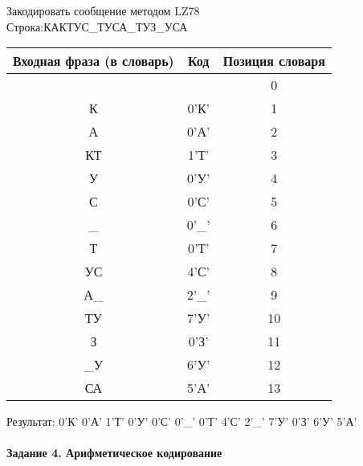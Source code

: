 \documentclass[a4paper, 12pt]{article}
\begin{document}
Закодировать сообщение методом LZ78\\
Строка:КАКТУС\_ТУСА\_ТУЗ\_УСА\\
\begin{table}[h!]
\centering
\begin{tabular}{|c|c|c|} 
\hline
 Входная фраза (в словарь) & Код & Позиция словаря \\ \hline

 &  & 0 \\ \hline
К & 0'К' & 1 \\ \hline
А & 0'А' & 2 \\ \hline
КТ & 1'Т' & 3 \\ \hline
У & 0'У' & 4 \\ \hline
С & 0'С' & 5 \\ \hline
\_ & 0'\_' & 6 \\ \hline
Т & 0'Т' & 7 \\ \hline
УС & 4'С' & 8 \\ \hline
А\_ & 2'\_' & 9 \\ \hline
ТУ & 7'У' & 10 \\ \hline
З & 0'З' & 11 \\ \hline
\_У & 6'У' & 12 \\ \hline
СА & 5'А' & 13 \\ \hline
\end{tabular}
\end{table}

Результат: 0'К' 0'А' 1'Т' 0'У' 0'С' 0'\_' 0'Т' 4'С' 2'\_' 7'У' 0'З' 6'У' 5'А'\\
\pagebreak
\paragraph{Задание 4. Арифметическое кодирование\\}
\end{document}
